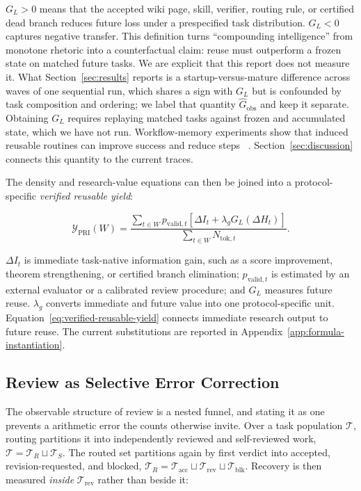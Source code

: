 $G_L>0$ means that the accepted wiki page, skill, verifier, routing rule, or
certified dead branch reduces future loss under a prespecified task distribution. $G_L<0$
captures negative transfer. This definition turns ``compounding intelligence''
from monotone rhetoric into a counterfactual claim: reuse must outperform a frozen
state on matched future tasks. We are explicit that this report does not measure
it. What Section~\ref{sec:results} reports is a startup-versus-mature difference
across waves of one sequential run, which shares a sign with $G_L$ but is confounded
by task composition and ordering; we label that quantity
$\hat{G}_{\mathrm{obs}}$ and keep it separate. Obtaining $G_L$ requires replaying
matched tasks against frozen and accumulated state, which we have not run. Workflow-memory experiments show that induced
reusable routines can improve success and reduce steps
~\citep{wang2024workflowmemory}. Section~\ref{sec:discussion} connects this quantity
to the current \systemname traces.

The density and research-value equations can then be joined into a
protocol-specific \emph{verified reusable yield}:

\begin{equation}
  \mathcal{Y}_{\mathrm{PRI}}(W)
  =\frac{
    \sum_{t\in W}p_{\mathrm{valid},t}
    \left[\Delta I_t+\lambda_g G_L(\Delta H_t)\right]
  }{
    \sum_{t\in W}N_{\mathrm{tok},t}
  }.
  \label{eq:verified-reusable-yield}
\end{equation}

$\Delta I_t$ is immediate task-native information gain, such as a score
improvement, theorem strengthening, or certified branch elimination;
$p_{\mathrm{valid},t}$ is estimated by an external evaluator or a calibrated review
procedure; and $G_L$ measures future reuse. $\lambda_g$ converts immediate and
future value into one protocol-specific unit. Equation~\ref{eq:verified-reusable-yield}
connects immediate research output to future reuse. The current substitutions are
reported in Appendix~\ref{app:formula-instantiation}.

\subsection{Review as Selective Error Correction}

The observable structure of review is a nested funnel, and stating it as one prevents
a arithmetic error the counts otherwise invite. Over a task population $\mathcal{T}$,
routing partitions it into independently reviewed and self-reviewed work,
$\mathcal{T}=\mathcal{T}_R\sqcup\mathcal{T}_S$. The routed set partitions again by
first verdict into accepted, revision-requested, and blocked,
$\mathcal{T}_R=\mathcal{T}_{\mathrm{acc}}\sqcup\mathcal{T}_{\mathrm{rev}}\sqcup
\mathcal{T}_{\mathrm{blk}}$. Recovery is then measured \emph{inside}
$\mathcal{T}_{\mathrm{rev}}$ rather than beside it:

